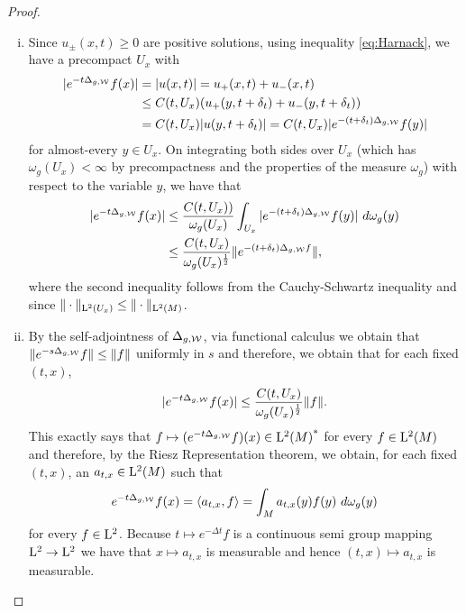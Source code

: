 \documentclass[a4paper, 12pt]{amsart}
\begin{document}
\begin{proof}
\begin{enumerate}[(i)]
\item  Since $u_{\pm}(x,t) \geq 0$ are positive solutions,
	using inequality \eqref{eq:Harnack}, we have a precompact $U_x$ 
	with 
	\begin{align*} 
	|e^{-t \Delta_{g,\mathcal{W}}}f(x)|  &= |u(x,t)| = u_+(x,t) + u_-(x,t) \\
		&\leq C(t,U_x) (u_+(y,t+\delta_t) + u_-(y,t+\delta_t)) \\
		&= C(t,U_x) |u(y,t + \delta_t)|
		= C(t,U_x)  |e^{-(t + \delta_t) \Delta_{g,\mathcal{W}}}f(y)|
	\end{align*} 
	for almost-every $y \in U_x$.
	On integrating both sides over $U_x$ (which has $\omega_g(U_x) < \infty$
	by precompactness and the properties of the measure $\omega_g$) with respect
	to the variable $y$,
	we have that
	\begin{align*} 
	|e^{-t \Delta_{g,\mathcal{W}}}f(x)| 
		&\leq \frac{C(t,U_x))}{\omega_g(U_x)} \int_{U_x} |e^{-(t + \delta_t) \Delta_{g,\mathcal{W}}}f(y)|\ d\omega_g(y) \\
		&\leq \frac{C(t,U_x)}{\omega_g(U_x)^{\frac{1}{2}}} \| e^{-(t + \delta_t) \Delta_{g,\mathcal{W}}f} \|,
	\end{align*}
	where the second inequality follows from the Cauchy-Schwartz
	inequality and since $\| \cdot \|_{{\rm L}^{2}_{\rm {}}(U_x)} \leq \| \cdot \|_{{\rm L}^{2}_{\rm {}}(M)}$.

\item By the self-adjointness of $\Delta_{g,\mathcal{W}}$, via functional calculus 
	we obtain that $\| e^{-s\Delta_{g,\mathcal{W}}}f \| \leq \| f \|$
	uniformly in $s$  and therefore, we obtain that for each fixed \((t, x)\),
	$$|e^{-t \Delta_{g,\mathcal{W}}}f(x)| \leq 
		\frac{C(t,U_x)}{\omega_g(U_x)^{\frac{1}{2}}} \| f \|.$$
	This exactly says that $f \mapsto (e^{-t\Delta_{g,\mathcal{W}}}f)(x) \in {{\rm L}^{2}_{\rm {}}(M)}^\ast$
	for every $f \in {\rm L}^{2}_{\rm {}}(M)$ and therefore, by the Riesz Representation theorem,
	we obtain, for each fixed \((t, x)\), an $a_{t,x} \in {\rm L}^{2}_{\rm {}}(M)$ such that
	$$ e^{-t \Delta_{g,\mathcal{W}}}f(x) = \langle a_{t,x},f \rangle = \int_{M} a_{t,x}(y)f(y)\ d\omega_g(y)$$
        for every \(f \in {\rm L}^{2}_{\rm {}}\). Because \(t \mapsto e^{-\Delta t} f\) is a continuous semi group mapping \({\rm L}^{2}_{\rm {}} \to {\rm L}^{2}_{\rm {}}\) we have that \(x \mapsto a_{t,x}\) is measurable and hence \((t, x) \mapsto a_{t,x}\) is measurable.


\end{enumerate}
\end{proof}
\end{document}

